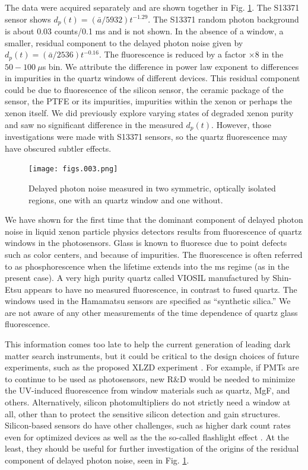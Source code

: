 \documentclass[%
 reprint,
superscriptaddress,
nofootinbib,
 amsmath,amssymb,
 aps,
prl,
]{revtex4-2}
\begin{document}
The data were acquired separately and are shown together in Fig. \ref{fig:no-window}. The S13371 sensor shows $d_p(t) = (\bar{a}/5932)t^{-1.29}$. The S13371 random photon background is about 0.03 counts/0.1 ms and is not shown. In the absence of a window, a smaller, residual component to the delayed photon noise given by $d_p(t) = (\bar{a}/2536) t^{-0.16}$. The fluorescence is reduced by a factor $\times8$ in the $50-100~\mu$s bin. We attribute the difference in power law exponent to differences in impurities in the quartz windows of different devices. This residual component could be due to fluorescence of the silicon sensor, the ceramic package of the sensor, the PTFE or its impurities, impurities within the xenon or perhaps the xenon itself. We did previously explore varying states of degraded xenon purity and saw no significant difference in the measured $d_p(t)$. However, those investigations were made with S13371 sensors, so the quartz fluorescence may have obscured subtler effects.

\begin{figure}[ht]
    \centering
    \texttt{[image: figs.003.png]}
    \caption{Delayed photon noise measured in two symmetric, optically isolated regions, one with an quartz window and one without.}
   \label{fig:no-window}
\end{figure}

We have shown for the first time that the dominant component of delayed photon noise in liquid xenon particle physics detectors results from fluorescence of quartz windows in the photosensors. Glass is known to fluoresce due to point defects such as color centers, and because of impurities\cite{Jedamzik:2017,Corujo:2022}.  The fluorescence is often referred to as phosphorescence when the lifetime extends into the ms regime \cite{Jedamzik:2017} (as in the present case). A very high purity quartz called VIOSIL manufactured by Shin-Etsu \cite{Shinetsu} appears to have no measured fluorescence, in contrast to fused quartz. The windows used in the Hamamatsu sensors are specified as ``synthetic silica.'' We are not aware of any other measurements of the time dependence of quartz glass fluorescence.

 This information comes too late to help the current generation of leading dark matter search instruments, but it could be critical to the design choices of future experiments, such as the proposed XLZD experiment \cite{Aalbers:2022dzr}. For example, if PMTs are to continue to be used as photosensors, new R\&D would be needed to minimize the UV-induced fluorescence from window materials such as quartz, MgF, and others. Alternatively, silicon photomultipliers do not strictly need a window at all, other than to protect the sensitive silicon detection and gain structures. Silicon-based sensors do have other challenges, such as higher dark count rates even for optimized devices \cite{Sakamoto:2023ond} as well as the the so-called flashlight effect \cite{Gibbons:2023iux}. At the least, they should be useful for further investigation of the origins of the residual component of delayed photon noise, seen in Fig. \ref{fig:no-window}.
\end{document}
